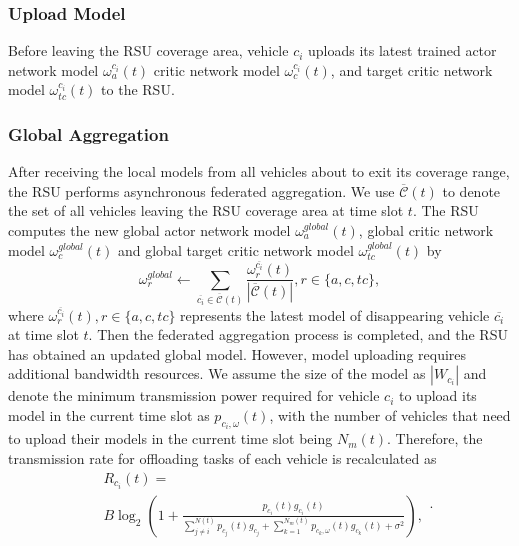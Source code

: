 \documentclass[lettersize,journal,onecolumn]{IEEEtran}
\begin{document}
\subsubsection {Upload Model} Before leaving the RSU coverage area, vehicle ${{{c}}_{i}}$ uploads its latest trained actor network model $\omega _{a}^{{{{c}}_{i}}}(t)$ critic network model $\omega _{c}^{{{{c}}_{i}}}(t)$, and target critic network model $\omega _{tc}^{{{{c}}_{i}}}(t)$ to the RSU.
\subsubsection {Global Aggregation} After receiving the local models from all vehicles about to exit its coverage range, the RSU performs asynchronous federated aggregation. We use $\overline{\mathcal{C}}\left( {t} \right)$ to denote the set of all vehicles leaving the RSU coverage area at time slot $t$. The RSU computes the new global actor network model $\omega _{a}^{global}(t)$, global critic network model $\omega _{c}^{global}(t)$ and global target critic network model $\omega _{tc}^{global}(t)$ by
\begin{equation}
\omega _{r}^{global}\leftarrow \sum\limits_{\overline{{{c}_{i}}}\in \overline{\mathcal{C}}\left( {t} \right)}{\frac{\omega _{r}^{\overline{{{c}_{i}}}}(t)}{\left| \overline{\mathcal{C}}\left( {t} \right) \right|}},r\in \{a,c,tc\}
\label{eq20},
\end{equation}
where $\omega _{r}^{\overline{{{c}_{i}}}}(t),r\in \{a,c,tc\}$ represents the latest model of disappearing vehicle $\overline{{{c}_{i}}}$ at time slot $t$. Then the federated aggregation process is completed, and the RSU has obtained an updated global model. 
However, model uploading requires additional bandwidth resources. We assume the size of the model as $|{{W}_{{{{c}}_{i}}}}|$ and denote the minimum transmission power required for vehicle ${{{c}}_{i}}$ to upload its model in the current time slot as ${{p}_{{{{c}}_{i}},\omega }}(t)$, with the number of vehicles that need to upload their models in the current time slot being ${{N}_{m}}(t)$. Therefore, the transmission rate for offloading tasks of each vehicle is recalculated as
\begin{equation}
\begin{aligned}
&{{R}_{{{{c}}_{i}}}}(t)= \\
&B {{\log }_{2}}\left( 1+\frac{{{p}_{{{{c}}_{i}}}}(t){{g}_{{{{c}}_{i}}}}(t)}{\sum\limits_{j\ne i}^{N(t)}{{{p}_{{{{c}}_{j}}}}}(t) {{g}_{{{{c}}_{j}}}}+\sum\limits_{k=1}^{{{N}_{m}}(t)}{{{p}_{{{{c}}_{k}},\omega }}}(t) {{g}_{{{{c}}_{k}}}}(t)+{{\sigma }^{2}}} \right),
\end{aligned}
\label{eq10}.
\end{equation}
\end{document}
